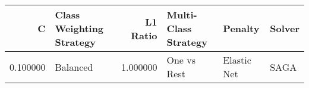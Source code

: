 \begin{tabular}{rlrlll}
\toprule
C & Class Weighting Strategy & L1 Ratio & Multi-Class Strategy & Penalty & Solver \\
\midrule
0.100000 & Balanced & 1.000000 & One vs Rest & Elastic Net & SAGA \\
\bottomrule
\end{tabular}
